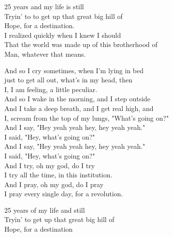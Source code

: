 
\re{}
25 years and my life is still\\ 
Tryin' to to get up that great big hill of\\
Hope, for a destination.  \\
I realized quickly when I knew I should\\ 
That the world was made up of this brotherhood of \\
Man, whatever that means.  

\cho{}
And so I cry sometimes, when I'm lying in bed\\
just to get all out, what's in my head, then\\
I, I am feeling, a little peculiar. \\
And so I wake in the morning, and I step outside\\
And I take a deep breath, and I get real high, and\\ 
I, scream from the top of my lungs, "What's going on?"\\ 
And I say, "Hey yeah yeah hey, hey yeah yeah."\\
I said, "Hey, what's going on?"\\
And I say, "Hey yeah yeah hey, hey yeah yeah."\\
I said, "Hey, what's going on?"\\
And I try, oh my god, do I try\\
I try all the time, in this institution.  \\
And I pray, oh my god, do I pray \\
I pray every single day, for a revolution.  

\cho{} 

\re{}
25 years of my life and still\\
Tryin' to get up that great big hill of\\
Hope, for a destination\\

\esong